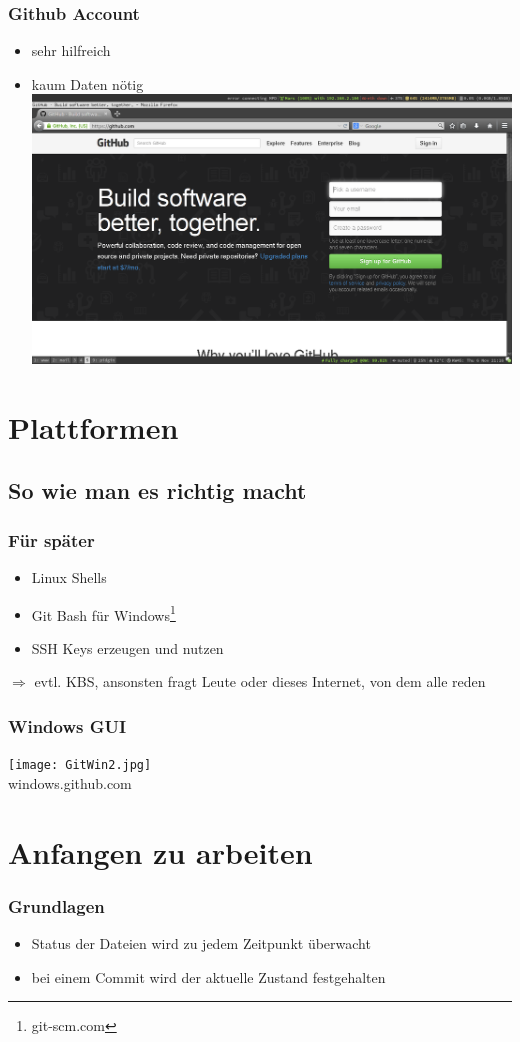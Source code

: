 \documentclass{beamer}
\begin{document}
\begin{frame}
\frametitle{Github Account}
\begin{itemize}
\item sehr hilfreich
\item kaum Daten n\"otig
\includegraphics[scale=0.2]{gitreg.png}
\end{itemize}
\end{frame}

\section{Plattformen}
\subsection{So wie man es richtig macht}
\begin{frame}
\frametitle{F\"ur sp\"ater}
\begin{itemize}
\item Linux Shells
\item Git Bash f\"ur Windows\footnote{git-scm.com}
\item SSH Keys erzeugen und nutzen
\end{itemize}
$\Rightarrow$ evtl. KBS, ansonsten fragt Leute oder dieses Internet, von dem alle reden
\end{frame}

\begin{frame}
\frametitle{Windows GUI}
\center
\texttt{[image: GitWin2.jpg]}\\
\small{windows.github.com}
\end{frame}

\section{Anfangen zu arbeiten}
\begin{frame}
\frametitle {Grundlagen}
\begin{itemize}
\item Status der Dateien wird zu jedem Zeitpunkt \"uberwacht
\item bei einem Commit wird der aktuelle Zustand festgehalten
\end{itemize}
\end{frame}
\end{document}

